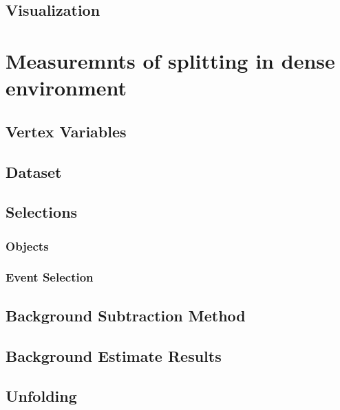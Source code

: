 \documentclass{report}
\begin{document}
\section{Visualization}

\clearpage

\chapter{Measuremnts of \gbb splitting in dense environment}
\label{chap:gbb}

\clearpage

\section{Vertex Variables}
\label{sec:gbb-var}

\clearpage

\section{Dataset}

\clearpage

\section{Selections}
\label{sec:gbb-selection}
\subsection{Objects}

\subsection{Event Selection}

\clearpage

\section{Background Subtraction Method}

\clearpage

\section{Background Estimate Results}

\clearpage

\section{Unfolding}
\label{sec:gbb-unfolding}

\clearpage
\end{document}
